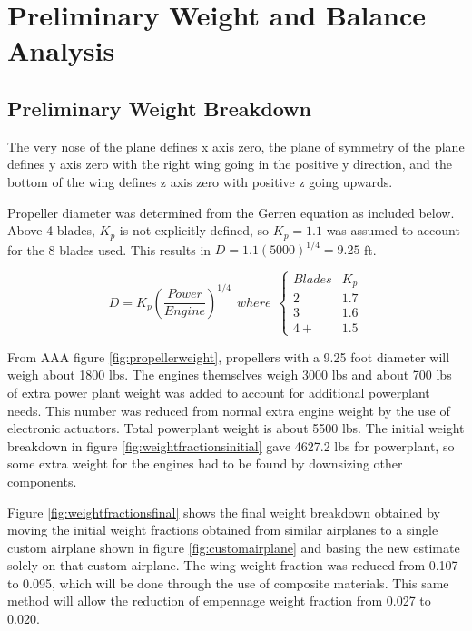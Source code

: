 \documentclass[conf]{new-aiaa}
\begin{document}
\section{Preliminary Weight and Balance Analysis}

\subsection{Preliminary Weight Breakdown}

The very nose of the plane defines x axis zero, the plane of symmetry of the plane defines y axis zero with the right wing going in the positive y direction, and the bottom of the wing defines z axis zero with positive z going upwards.

Propeller diameter was determined from the Gerren equation as included below\cite{pres18}. Above 4 blades, $K_p$ is not explicitly defined, so $K_p=1.1$ was assumed to account for the 8 blades used. This results in $D=1.1(5000)^{1/4}=9.25$ ft.

\[ D = K_p(\frac{Power}{Engine})^{1/4} \ \ where\ \ \begin{cases} 
      Blades & K_p \\
      2 & 1.7 \\
      3 &  1.6 \\
      4+ & 1.5 
   \end{cases}
\] 

From AAA figure \ref{fig:propellerweight}, propellers with a 9.25 foot diameter will weigh about 1800 lbs. The engines themselves weigh 3000 lbs and about 700 lbs of extra power plant weight was added to account for additional powerplant needs. This number was reduced from normal extra engine weight by the use of electronic actuators. Total powerplant weight is about 5500 lbs. The initial weight breakdown in figure \ref{fig:weightfractionsinitial} gave 4627.2 lbs for powerplant, so some extra weight for the engines had to be found by downsizing other components. 

Figure \ref{fig:weightfractionsfinal} shows the final weight breakdown obtained by moving the initial weight fractions obtained from similar airplanes to a single custom airplane shown in figure \ref{fig:customairplane} and basing the new estimate solely on that custom airplane. The wing weight fraction was reduced from 0.107 to 0.095, which will be done through the use of composite materials. This same method will allow the reduction of empennage weight fraction from 0.027 to 0.020. 
\end{document}

